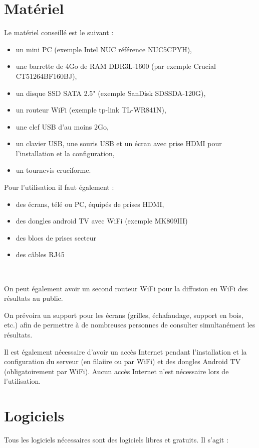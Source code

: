 \documentclass[a4paper]{ffco-rapport}
\begin{document}
\chapter{Matériel}
	Le matériel conseillé est le suivant :

	\begin{itemize}
		\item un mini PC (exemple Intel NUC référence NUC5CPYH),
		\item une barrette de 4Go de RAM DDR3L-1600 (par exemple Crucial CT51264BF160BJ),
		\item un disque SSD SATA 2.5" (exemple SanDisk SDSSDA-120G),
		\item un routeur WiFi (exemple  tp-link TL-WR841N),
		\item une clef USB d'au moins 2Go,
		\item un clavier USB, une souris USB et un écran avec prise HDMI pour l'installation et la configuration,
		\item un tournevis cruciforme.
	\end{itemize}
	
	Pour l'utilisation il faut également :
	\begin{itemize}
		\item des écrans, télé ou PC, équipés de prises HDMI,
		\item des dongles android TV avec WiFi (exemple MK809III)
		\item des blocs de prises secteur
		\item des câbles RJ45
	\end{itemize}
	~
	
	On peut également avoir un second routeur WiFi pour la diffusion en WiFi des résultats au public.
	
	On prévoira un support pour les écrans (grilles, échafaudage, support en bois, etc.) afin de permettre à de nombreuses personnes de consulter simultanément les résultats.
	
	Il est également nécessaire d'avoir un accès Internet pendant l'installation et la configuration du serveur (en filaiire ou par WiFi) et des dongles Android TV (obligatoirement par WiFi). Aucun accès Internet n'est nécessaire lors de l'utilisation.

\chapter{Logiciels}
	Tous les logiciels nécessaires sont des logiciels libres et gratuits. Il s'agit :
	
\end{document}
